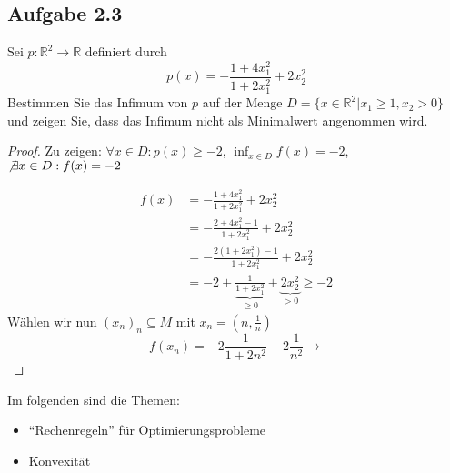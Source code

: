 \documentclass[12pt]{extreport} %
\newcommand{\R}{\mathbb{R}}
\theoremstyle{named}
\theoremstyle{nnamed}
\theoremstyle{itshape}
\theoremstyle{normal}
\begin{document}
\subsection*{Aufgabe 2.3}

Sei $p \colon \R^2 \rightarrow \R$ definiert durch
$$ p(x) = - \frac{1 + 4 x^2_1}{1 + 2 x_1^2} + 2 x_2^2 $$
Bestimmen Sie das Infimum von $p$ auf der Menge $D = \{ x \in \R^2 | x_1 \geq 1, x_2 > 0 \}$ und zeigen Sie, dass das Infimum nicht als Minimalwert angenommen wird.

\begin{proof}
	Zu zeigen: $\forall x \in D: p(x) \geq -2$, $\inf_{x \in D} f(x) = - 2$, $\not\exists x \in D: f(x) = -2$
	
	\begin{align*}
		f(x) & = - \frac{1 + 4x_1^2}{1 + 2x_1^2} + 2 x_2^2 \\
			& = - \frac{2 + 4 x_1^2 - 1}{1 + 2x_1^2	} + 2 x_2^2 \\
			& = - \frac{2 ( 1+ 2 x_1^2) - 1}{1 + 2 x_1^2} + 2x_2^2 \\
			& = - 2 + \underbrace{\frac{1}{1 + 2 x_1^2}}_{\geq 0} + \underbrace{2 x_2^2}_{> 0} \geq -2
	\end{align*}
 	Wählen wir nun $(x_n)_n \subseteq M$ mit $x_n = \left( n , \frac{1}{n} \right)$
 	$$ f(x_n) = - 2  \frac{1}{1 + 2 n ^2} + 2 \frac{1}{n^2} \rightarrow  $$
\end{proof}

Im folgenden sind die Themen:
\begin{itemize}
	\item \enquote{Rechenregeln} für Optimierungsprobleme
	\item Konvexität
\end{itemize}
\end{document}
